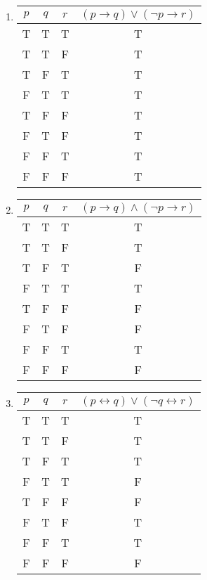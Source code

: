 \documentclass[10pt]{exam}
\begin{document}
\begin{questions}
\begin{enumerate}
    \item 
  \begin{table}[h!]
  \centering 
  \begin{tabular}{|c|c|c|c|}
  \hline
  $p$ & $q$ & $r$ & $(p \rightarrow q) \lor (\neg p \rightarrow r)$ \\
  \hline
  T & T & T & T\\
  T & T & F & T\\
  T & F & T & T\\
  F & T & T & T\\
  T & F & F & T\\
  F & T & F & T\\
  F & F & T & T\\
  F & F & F & T\\
  \hline
  \end{tabular}
  \end{table}

    \item 
  \begin{table}[h!]
  \centering 
  \begin{tabular}{|c|c|c|c|}
  \hline
  $p$ & $q$ & $r$ & $(p \rightarrow q) \land (\neg p \rightarrow r)$ \\
  \hline
  T & T & T & T\\
  T & T & F & T\\
  T & F & T & F\\
  F & T & T & T\\
  T & F & F & F\\
  F & T & F & F\\
  F & F & T & T\\
  F & F & F & F\\
  \hline
  \end{tabular}
  \end{table}

  \newpage
    \item 
  \begin{table}[!ht]
  \centering 
  \begin{tabular}{|c|c|c|c|}
  \hline
  $p$ & $q$ & $r$ & $(p \leftrightarrow q) \lor (\neg q \leftrightarrow r)$ \\
  \hline
  T & T & T & T \\
  T & T & F & T \\
  T & F & T & T \\
  F & T & T & F \\
  T & F & F & F \\
  F & T & F & T \\
  F & F & T & T \\
  F & F & F & F \\
  \hline
  \end{tabular}
  \end{table}


\end{enumerate}
\end{questions}
\end{document}
